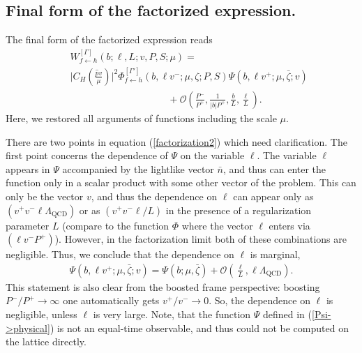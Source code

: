 \documentclass[a4paper, amsfonts, amssymb, amsmath, reprint, showkeys, nofootinbib, twoside]{revtex4-1}
\newcommand{\nn}{\nonumber}
\newcommand{\ot}{\leftarrow}
\renewcommand{\(}{\left(}
\renewcommand{\)}{\right)}
\renewcommand{\[}{\left[}
\renewcommand{\]}{\right]}
\begin{document}
\subsection{Final form of the factorized expression.}

The final form of the factorized expression reads
\begin{eqnarray}\label{factorization2}
&&W_{f\ot h}^{[\Gamma]}(b;\ell,L;v,P,S;\mu)=
\\\nn &&\Big|C_H\(\frac{\hat p v}{\mu}\)\Big|^2\Phi_{f\ot h}^{[\Gamma']}(b,\ell v^-;\mu,\zeta;P,S)
\Psi(b,\ell v^+;\mu,\bar \zeta;v)
\\\nn &&\qquad\qquad\qquad\qquad\qquad
+\mathcal{O}\(\frac{P^-}{P^+},\frac{1}{|b|P^+},\frac{b}{L},\frac{\ell}{L}\).
\end{eqnarray}
Here, we restored all arguments of functions including the scale $\mu$. 

There are two points in equation (\ref{factorization2}) which need clarification. The first point concerns the dependence of $\Psi$ on the variable $\ell$. The variable $\ell$ appears in $\Psi$ accompanied by the lightlike vector $\bar n$, and thus can enter the function only in a scalar product with some other vector of the problem. This can only be the vector $v$, and thus the dependence on $\ell$ can appear only as $(v^+v^-\ell \Lambda_{\text{QCD}})$ or as $(v^+v^-\ell/L)$ in the presence of a regularization parameter $L$  (compare to the function $\Phi$ where the vector $\ell$ enters via $(\ell v^- P^+)$). However, in the factorization limit both of these combinations are negligible. Thus, we conclude that the dependence on $\ell$ is marginal,
\begin{eqnarray}\label{Psi-on-l}
\Psi(b,\ell v^+;\mu,\bar \zeta;v)=\Psi(b;\mu,\bar \zeta)+\mathcal{O}\(\frac{\ell}{L},\ell\Lambda_{\text{QCD}}\).
\end{eqnarray}
This statement is also clear from the boosted frame perspective: boosting $P^-/P^+\to\infty$ one automatically gets $v^+/v^-\to0$. So, the dependence on  $\ell$ is negligible, unless $\ell$ is very large. Note, that the function $\Psi$ defined in (\ref{Psi->physical}) is not an equal-time observable, and thus could not be computed on the lattice directly.
\end{document}

